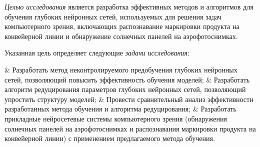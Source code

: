 \vspace{3mm}
\aim
\vspace{3mm}

\textit{Целью исследования} является разработка эффективных методов и алгоритмов для обучения глубоких нейронных сетей, используемых для решения задач компьютерного зрения, включающих распознавание маркировки продукта на конвейерной линии и обнаружение солнечных панелей на аэрофотоснимках.

Указанная цель определяет следующие \textit{задачи исследования}:
\begin{easylistNum}
	& Разработать метод неконтролируемого предобучения глубоких нейронных сетей, позволяющий повысить эффективность обучения моделей;
	& Разработать алгоритм редуцирования параметров глубоких нейронных сетей, позволяющий упростить структуру моделей;
	& Провести сравнительный анализ эффективности разработанных метода обучения и алгоритма редуцирования;
	& Разработать прикладные нейросетевые системы компьютерного зрения (обнаружения солнечных панелей на аэрофотоснимках и распознавания маркировки продукта на конвейерной линии) с применением предлагаемого метода обучения.
\end{easylistNum}



